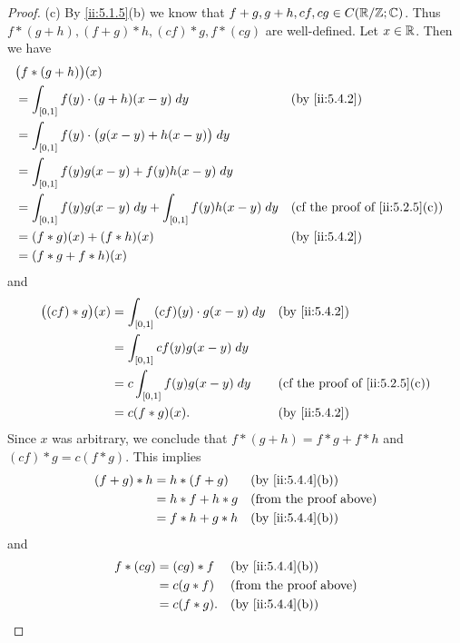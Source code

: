 \begin{proof}{(c)}
  By \cref{ii:5.1.5}(b) we know that \(f + g, g + h, cf, cg \in C(\mathbb{R} / \mathbb{Z} ; \mathbb{C})\).
  Thus \(f * (g + h), (f + g) * h, (cf) * g, f * (cg)\) are well-defined.
  Let \(x \in \mathbb{R}\).
  Then we have
  \begin{align*}
     & \big(f * (g + h)\big)(x)                                                                                                 \\
     & = \int_{[0, 1]} f(y) \cdot (g + h)(x - y) \; dy                         &  & \by{ii:5.4.2}                               \\
     & = \int_{[0, 1]} f(y) \cdot \big(g(x - y) + h(x - y)\big) \; dy                                                           \\
     & = \int_{[0, 1]} f(y) g(x - y) + f(y) h(x - y) \; dy                                                                      \\
     & = \int_{[0, 1]} f(y) g(x - y) \; dy + \int_{[0, 1]} f(y) h(x - y) \; dy &  & \text{(cf the proof of \cref{ii:5.2.5}(c))} \\
     & = (f * g)(x) + (f * h)(x)                                               &  & \by{ii:5.4.2}                               \\
     & = (f * g + f * h)(x)
  \end{align*}
  and
  \begin{align*}
    \big((cf) * g\big)(x) & = \int_{[0, 1]} (cf)(y) \cdot g(x - y) \; dy &  & \by{ii:5.4.2}                               \\
                          & = \int_{[0, 1]} c f(y) g(x - y) \; dy                                                         \\
                          & = c \int_{[0, 1]} f(y) g(x - y) \; dy        &  & \text{(cf the proof of \cref{ii:5.2.5}(c))} \\
                          & = c (f * g)(x).                              &  & \by{ii:5.4.2}
  \end{align*}
  Since \(x\) was arbitrary, we conclude that \(f * (g + h) = f * g + f * h\) and \((cf) * g = c (f * g)\).
  This implies
  \begin{align*}
    (f + g) * h & = h * (f + g)   &  & \by{ii:5.4.4}[b]              \\
                & = h * f + h * g &  & \text{(from the proof above)} \\
                & = f * h + g * h &  & \by{ii:5.4.4}[b]
  \end{align*}
  and
  \begin{align*}
    f * (cg) & = (cg) * f  &  & \by{ii:5.4.4}[b]              \\
             & = c(g * f)  &  & \text{(from the proof above)} \\
             & = c(f * g). &  & \by{ii:5.4.4}[b]
  \end{align*}
\end{proof}

